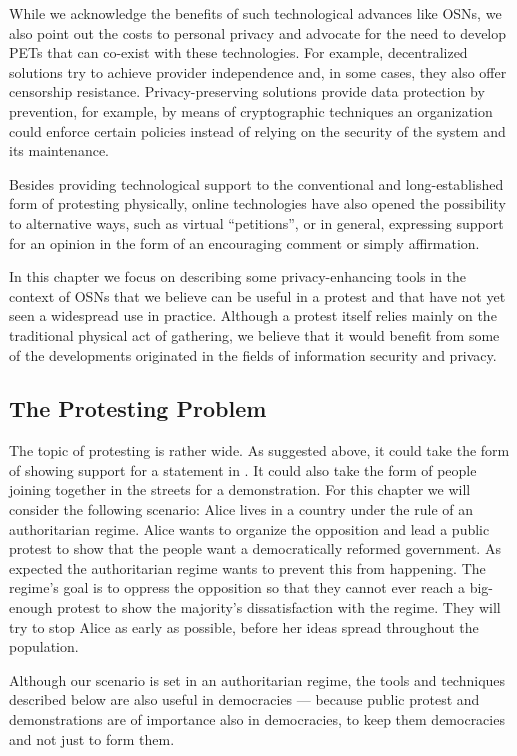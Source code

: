 While we acknowledge the benefits of such technological advances like
\acp{OSN}, we also point out the costs to personal privacy and
advocate for the need to develop \acp{PET} that
can co-exist with these technologies. For example, decentralized
solutions try to achieve provider independence and, in some cases,
they also offer censorship resistance. Privacy-preserving solutions
provide data protection by prevention, for example, by means of
cryptographic techniques an organization could enforce certain
policies instead of relying on the security of the system and its
maintenance.

Besides providing technological support to the conventional and
long-established form of protesting physically, online technologies
have also opened the possibility to alternative ways, such as virtual
\enquote{petitions}, or in general, expressing support for an opinion
in the form of an encouraging comment or simply affirmation.

In this chapter we focus on describing some privacy-enhancing tools in
the context of \acp{OSN} that we believe can be useful in a protest
and that have not yet seen a widespread use in practice. Although a
protest itself relies mainly on the traditional physical act of
gathering, we believe that it would benefit from some of the
developments originated in the fields of information security and
privacy.

\subsection{The Protesting Problem}

The topic of protesting is rather wide.
As suggested above, it could take the form of showing support for a statement 
in .
It could also take the form of people joining together in the streets for 
a demonstration.
For this chapter we will consider the following scenario:
Alice lives in a country under the rule of an authoritarian regime.
Alice wants to organize the opposition and lead a public protest to show that 
the people want a democratically reformed government.
As expected the authoritarian regime wants to prevent this from happening.
The regime's goal is to oppress the opposition so that they cannot ever reach 
a big-enough protest to show the majority's dissatisfaction with the regime.
They will try to stop Alice as early as possible, before her ideas spread 
throughout the population.

Although our scenario is set in an authoritarian regime, the tools and 
techniques described below are also useful in democracies --- because public 
protest and demonstrations are of importance also in democracies, to keep them 
democracies and not just to form them.

